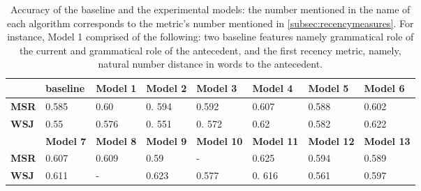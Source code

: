 \begin{table*}[htbp]
\centering
\begin{tabular}{l|l|l|l|l|l|l|l|}
\cline{2-8}
                          & \textbf{baseline}    & \textbf{Model 1}   & \textbf{Model 2}   & \textbf{Model 3 }     & \textbf{Model 4}   & \textbf{Model 5} & \textbf{Model 6} \\ \hline
\multicolumn{1}{|l|}{\textbf{MSR}} &    0.585   & 0.60      &     0. 594     &      0.592    &    0.607   &       0.588        &      0.602       \\ \hline
\multicolumn{1}{|l|}{\textbf{WSJ}} &     0.55    &  0.576       &      0. 551     &      0. 572    &     0.62      &     0.582         &       0.622      \\ \hline
                          & \textbf{Model 7}  & \textbf{Model 8}  & \textbf{Model 9}  & \textbf{Model 10} & \textbf{Model 11 } & \textbf{Model 12}     & \textbf{Model 13}   \\ \hline
\multicolumn{1}{|l|}{\textbf{MSR}} &   0.607   &  0.609     &      0.59  &  -      &     0.625      &       0.594        &      0.589       \\ \hline
\multicolumn{1}{|l|}{\textbf{WSJ}} &  0.611    &  -     &    0.623    &  0.577     &     0. 616    &       0.561        &         0.597    \\ \hline
\end{tabular}
\caption{\label{systems} Accuracy of the baseline and the experimental models: 
the number mentioned in the name of each algorithm corresponds to the metric's number mentioned in \autoref{subsec:recencymeasures}. For instance, Model 1 comprised of the following: two baseline features namely grammatical role of the current and grammatical role of the antecedent, and the first recency metric, namely, natural number distance in words to the antecedent.}
\end{table*}
